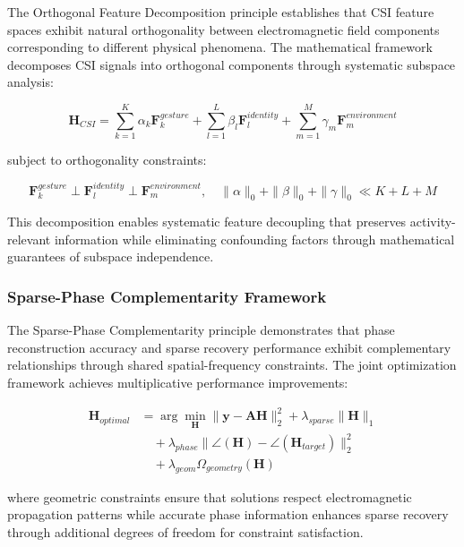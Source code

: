 \documentclass[journal]{IEEEtran}
\begin{document}
The Orthogonal Feature Decomposition principle establishes that CSI feature spaces exhibit natural orthogonality between electromagnetic field components corresponding to different physical phenomena. The mathematical framework decomposes CSI signals into orthogonal components through systematic subspace analysis:

\begin{equation}
\mathbf{H}_{CSI} = \sum_{k=1}^{K} \alpha_k \mathbf{F}_k^{gesture} + \sum_{l=1}^{L} \beta_l \mathbf{F}_l^{identity} + \sum_{m=1}^{M} \gamma_m \mathbf{F}_m^{environment}
\label{eq:orthogonal_decomposition}
\end{equation}

subject to orthogonality constraints:

\begin{equation}
\mathbf{F}_k^{gesture} \perp \mathbf{F}_l^{identity} \perp \mathbf{F}_m^{environment}, \quad \|\alpha\|_0 + \|\beta\|_0 + \|\gamma\|_0 \ll K+L+M
\label{eq:orthogonal_constraints}
\end{equation}

This decomposition enables systematic feature decoupling that preserves activity-relevant information while eliminating confounding factors through mathematical guarantees of subspace independence.

\subsubsection{Sparse-Phase Complementarity Framework}

The Sparse-Phase Complementarity principle demonstrates that phase reconstruction accuracy and sparse recovery performance exhibit complementary relationships through shared spatial-frequency constraints. The joint optimization framework achieves multiplicative performance improvements:

\begin{align}
\mathbf{H}_{optimal} &= \arg\min_{\mathbf{H}} \|\mathbf{y} - \mathbf{A}\mathbf{H}\|_2^2 + \lambda_{sparse} \|\mathbf{H}\|_1 \nonumber \\
&\quad + \lambda_{phase} \|\angle(\mathbf{H}) - \angle(\mathbf{H}_{target})\|_2^2 \nonumber \\
&\quad + \lambda_{geom} \Omega_{geometry}(\mathbf{H}) \label{eq:sparse_phase_joint}
\end{align}

where geometric constraints ensure that solutions respect electromagnetic propagation patterns while accurate phase information enhances sparse recovery through additional degrees of freedom for constraint satisfaction.
\end{document}
